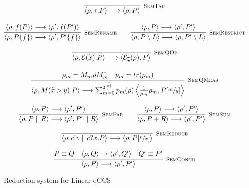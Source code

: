 \begin{figure}[h!]
  \begin{gather*}
    \infer[\mbox{\footnotesize\scshape SemTau}]{\langle \rho, \tau . P \rangle \longrightarrow \langle \rho, P \rangle}{} \\[0.3cm]
    \infer[\mbox{\footnotesize\scshape SemRename}]{\langle \rho, P \{f\} \rangle \longrightarrow \langle \rho', P' \{f\}\rangle}{\langle \rho, f(P) \rangle \longrightarrow \langle \rho', f(P') \rangle} \qquad
    \infer[\mbox{\footnotesize\scshape SemRestrict}]{\langle \rho, P \setminus L \rangle \longrightarrow \langle \rho, P' \setminus L \rangle}{\langle \rho, P \rangle \longrightarrow \langle \rho', P' \rangle} \\[0.3cm]
    \infer[\mbox{\footnotesize\scshape SemQOp}]{\langle \rho, \mathcal{E}(\widetilde{x}) . P \rangle \longrightarrow \langle \mathcal{E}_{\widetilde{x}}(\rho), P \rangle}{} \\[0.3cm]
    \infer[\mbox{\footnotesize\scshape SemQMeas}]{\langle \rho, M(\widetilde{x} \rhd y) . P \rangle \longrightarrow \sum_{m = 0}^{2^{|\widetilde{x}|}} p_m(\rho) \left\langle \frac{1}{p_m}\rho_m , P[\sfrac{m}{y}] \right\rangle}{\rho_m = M_m \rho M_m^\dag & p_m = tr(\rho_m)} \\[0.3cm]
    \infer[\mbox{\footnotesize\scshape SemPar}]{\langle \rho, P \parallel R \rangle \longrightarrow \langle \rho', P' \parallel R \rangle}{\langle \rho, P \rangle \longrightarrow \langle \rho', P' \rangle} \qquad
    \infer[\mbox{\footnotesize\scshape SemSum}]{\langle \rho, P + R \rangle \longrightarrow \langle \rho', P' \rangle}{\langle \rho, P \rangle \longrightarrow \langle \rho', P' \rangle} \\[0.3cm]
    \infer[\mbox{\footnotesize\scshape SemReduce}]{\langle \rho, c!v \parallel c?x . P \rangle \longrightarrow \langle \rho, P[\sfrac{v}{x}] \rangle}{} \\[0.3cm]
    \infer[\mbox{\footnotesize\scshape SemCongr}]{\langle \rho, P \rangle \longrightarrow \langle \rho', P' \rangle}
    {P \equiv Q & \confw{\rho, Q} \rightarrow \confw{\rho', Q'} & Q' \equiv P'}
  \end{gather*}
\caption{Reduction system for Linear qCCS}
\label{reduction}
\end{figure}
  

